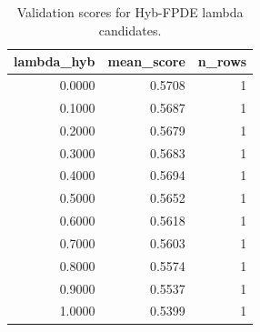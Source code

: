 \begin{table}[t]
\caption{Validation scores for Hyb-FPDE lambda candidates.}
\label{tab:lambda_distribution_computed}
\centering
\begin{tabular}{rrr}
\toprule
lambda\_hyb & mean\_score & n\_rows \\
\midrule
0.0000 & 0.5708 & 1 \\
0.1000 & 0.5687 & 1 \\
0.2000 & 0.5679 & 1 \\
0.3000 & 0.5683 & 1 \\
0.4000 & 0.5694 & 1 \\
0.5000 & 0.5652 & 1 \\
0.6000 & 0.5618 & 1 \\
0.7000 & 0.5603 & 1 \\
0.8000 & 0.5574 & 1 \\
0.9000 & 0.5537 & 1 \\
1.0000 & 0.5399 & 1 \\
\bottomrule
\end{tabular}

\end{table}
